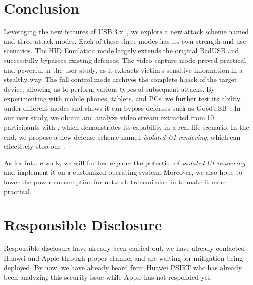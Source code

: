 \section{Conclusion}
\label{sec:conclusion}

Leveraging the new features of \ac{USB} 3.x~\cite{usb30,usb31,usb32}, we explore a
new attack scheme named \tool and three attack modes. Each of these three modes
has its own strength and use scenarios. The \ac{HID} Emulation mode largely extends the
original BadUSB and successfully bypasses existing defenses. The video capture mode proved practical and powerful in the user study, as it extracts
victim's sensitive information in a stealthy way. The full control mode
archives the complete hijack of the target device, allowing us to perform various
types of subsequent attacks. By experimenting \tool with mobile phones, tablets,
and PCs, we further test its ability under different modes and shows it can
bypass defenses such as GoodUSB~\cite{tian2015defending}. In our user study, we
obtain and analyze video stream extracted from 10 participants with \tool,
which demonstrates its capability in a real-life scenario. In the end, we
propose a new defense scheme named \textit{isolated UI rendering}, which can
effectively stop our \tool.

As for future work, we will further explore the potential of \textit{isolated UI
rendering} and implement it on a customized operating system. Moreover, we also
hope to lower the power consumption for network transmission in \tool to make
it more practical.

\section{Responsible Disclosure}

Responsible disclosure have already been carried out, we have already contacted Huawei and Apple through proper channel and are waiting for mitigation being deployed. By now, we have already heard from Huawei PSIRT who has already been analyzing this security issue while Apple has not responded yet. 
